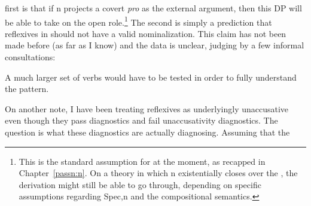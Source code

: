 \begin{exe}
\begin{xlist}
\begin{xlist}
\begin{exe}
\begin{xlist}
\begin{xlist}
\begin{exe}
\begin{xlist}
\begin{xlist}
\begin{exe}
\begin{exe}
\begin{xlist}
\begin{exe}
\begin{exe}
\begin{xlist}
\begin{exe}
\begin{exe}
\begin{exe}
\begin{exe}
\begin{exe}
\begin{xlist}
\begin{exe}
\begin{xlist}
\begin{exe}
\begin{exe}
\begin{xlist}
\begin{exe}
\begin{xlist}
\begin{exe}
\begin{exe}
\begin{exe}
\begin{xlist}
\begin{exe}
\begin{exe}
\begin{exe}
\begin{xlist}
\begin{exe}
\begin{xlist}
\begin{exe}
\begin{xlist}
\begin{exe}
\begin{xlist}
\begin{exe}
\begin{exe}
\begin{exe}
\begin{exe}
\begin{xlist}
\begin{exe}
\begin{xlist}
\begin{exe}
\begin{xlist}
\begin{exe}
\begin{xlist}
\begin{exe}
\begin{xlist}
\begin{exe}
\begin{xlist}
\begin{exe}
\begin{exe}
\begin{exe}
\begin{exe}
\begin{xlist}
\begin{exe}
\begin{xlist}
\begin{exe}
\begin{xlist}
\begin{exe}
\begin{exe}
\begin{xlist}
\begin{exe}
\begin{exe}
\begin{exe}
\begin{exe}
\begin{xlist}
\begin{xlist}
\begin{exe}
\begin{xlist}
\begin{exe}
\begin{exe}
\begin{exe}
\begin{xlist}
\begin{exe}
\begin{exe}
\begin{xlist}
\begin{exe}
\begin{exe}
\begin{exe}
\begin{xlist}
\begin{xlist}
\begin{exe}
\begin{xlist}
\begin{exe}
\begin{exe}
\begin{exe}
\begin{exe}
\begin{xlist}
\begin{exe}
\begin{xlist}
\begin{exe}
\begin{xlist}
\begin{exe}
\begin{exe}
\begin{exe}
\begin{exe}
\begin{exe}
first is that if n projects a covert \emph{pro} as the external argument, then this DP will be able to take on the open  role.\footnote{This is the standard assumption for  at the moment, as recapped in Chapter~\ref{passn:n}. On a theory in which n existentially closes over the , the derivation might still be able to go through, depending on specific assumptions regarding Spec,n and the compositional semantics.} The second is simply a prediction that reflexives in {\thit} should not have a valid nominalization. This claim has not been made before (as far as I know) and the data is unclear, judging by a few informal consultations:
 \begin{exe}
 \ex  
 \begin{xlist} 
	
	
 \z
\z  
A much larger set of verbs would have to be tested in order to fully understand the pattern.

On another note, I have been treating reflexives as underlyingly unaccusative even though they pass  diagnostics and fail unaccusativity diagnostics. The question is what these diagnostics are actually diagnosing. Assuming that the 
\end{xlist}
\end{exe}
\end{exe}
\end{exe}
\end{exe}
\end{exe}
\end{exe}
\end{xlist}
\end{exe}
\end{xlist}
\end{exe}
\end{xlist}
\end{exe}
\end{exe}
\end{exe}
\end{exe}
\end{xlist}
\end{exe}
\end{xlist}
\end{xlist}
\end{exe}
\end{exe}
\end{exe}
\end{xlist}
\end{exe}
\end{exe}
\end{xlist}
\end{exe}
\end{exe}
\end{exe}
\end{xlist}
\end{exe}
\end{xlist}
\end{xlist}
\end{exe}
\end{exe}
\end{exe}
\end{exe}
\end{xlist}
\end{exe}
\end{exe}
\end{xlist}
\end{exe}
\end{xlist}
\end{exe}
\end{xlist}
\end{exe}
\end{exe}
\end{exe}
\end{exe}
\end{xlist}
\end{exe}
\end{xlist}
\end{exe}
\end{xlist}
\end{exe}
\end{xlist}
\end{exe}
\end{xlist}
\end{exe}
\end{xlist}
\end{exe}
\end{exe}
\end{exe}
\end{exe}
\end{xlist}
\end{exe}
\end{xlist}
\end{exe}
\end{xlist}
\end{exe}
\end{xlist}
\end{exe}
\end{exe}
\end{exe}
\end{xlist}
\end{exe}
\end{exe}
\end{exe}
\end{xlist}
\end{exe}
\end{xlist}
\end{exe}
\end{exe}
\end{xlist}
\end{exe}
\end{xlist}
\end{exe}
\end{exe}
\end{exe}
\end{exe}
\end{exe}
\end{xlist}
\end{exe}
\end{exe}
\end{xlist}
\end{exe}
\end{exe}
\end{xlist}
\end{xlist}
\end{exe}
\end{xlist}
\end{xlist}
\end{exe}
\end{xlist}
\end{xlist}
\end{exe}
